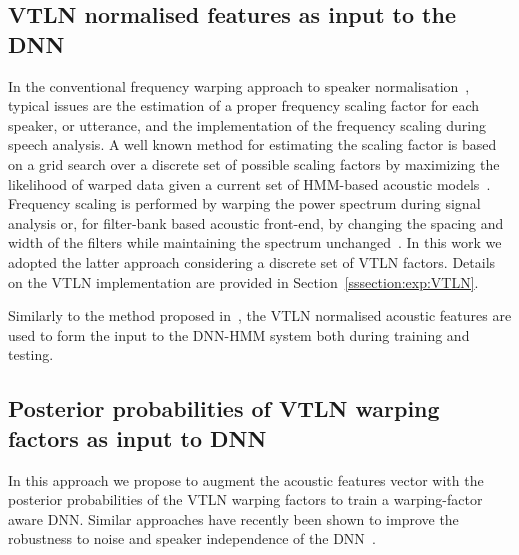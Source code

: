 \documentclass{nle}
\begin{document}
\subsection{VTLN normalised features as input to the DNN}
In   the   conventional   frequency   warping  approach   to   speaker
normalisation~\citep{EidGis96,LeeRos96,WegMcaOrlPek96},  typical issues
are  the estimation  of a  proper  frequency scaling  factor for  each
speaker, or utterance, and the implementation of the frequency scaling
during  speech  analysis.  A  well  known  method  for estimating  the
scaling  factor is  based on  a  grid search  over a  discrete set  of
possible scaling  factors by maximizing the likelihood  of warped data
given  a  current set  of  HMM-based acoustic  models~\citep{LeeRos96}.
Frequency scaling  is performed by  warping the power  spectrum during
signal  analysis  or, for  filter-bank  based  acoustic front-end,  by
changing the  spacing and width  of the filters while  maintaining the
spectrum  unchanged~\citep{LeeRos96}.   In  this  work we  adopted  the
latter approach considering a discrete set of VTLN factors. Details on the VTLN implementation  are provided in
Section~\ref{sssection:exp:VTLN}.

Similarly to the method proposed in~\citet{seide11}, the VTLN normalised
acoustic features are used to form the input to the DNN-HMM system both
during training and testing.

\subsection{Posterior probabilities of VTLN warping factors as input to DNN}
In this  approach we propose  to augment the acoustic  features vector
with the posterior probabilities of  the VTLN warping factors to train
a warping-factor  aware DNN.   Similar approaches have  recently been
shown  to  improve the  robustness  to noise and  speaker  independence of  the
DNN~\citep{export:194344,42536}.
\end{document}
